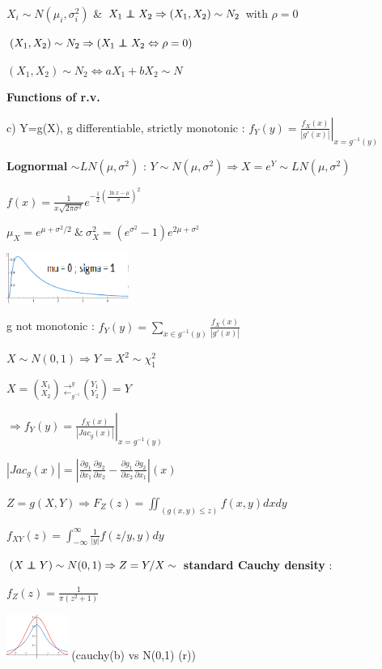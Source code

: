\documentclass[a4paper,10.5pt]{article}
\newcommand\independent{\protect\mathpalette{\protect\independenT}{\perp}}
\def\independenT#1#2{\mathrel{\rlap{$#1#2$}\mkern2mu{#1#2}}}
\begin{document}
\begin{multicols}{4}
		$X_i \sim N(\mu_i,\sigma_i^2)$ \& $X_1 \independent X_2 \Rightarrow (X_1,X_2) \sim N_2$ with $\rho=0$
		
		$(X_1,X_2)\sim N_2 \Rightarrow \left(X_1 \independent X_2 \Leftrightarrow \rho = 0\right)$
		
		$(X_1,X_2) \sim N_2 \Leftrightarrow aX_1+bX_2 \sim N$
		
		\textbf{Functions of r.v.}
		
		c) Y=g(X), g differentiable, strictly monotonic : $f_Y(y) = \left.\frac{f_X(x)}{|g'(x)|}\right|_{x=g^{-1}(y)}$
		
		\textbf{Lognormal} $\sim LN(\mu,\sigma^2)$ : $Y\sim N(\mu,\sigma^2) \Rightarrow X=e^Y \sim LN(\mu,\sigma^2)$ 
		
		$f(x) = \frac{1}{x\sqrt{2\pi\sigma^2}}e^{-\frac{1}{2}\left(\frac{\ln x - \mu}{\sigma}\right)^2}$
		
		$\mu_X = e^{\mu+\sigma^2/2}\ \&\ \sigma_X^2 = (e^{\sigma^2}-1)e^{2\mu+\sigma^2}$
		
		\includegraphics[width=4cm]{img/ln.png}
		
		g not monotonic : $f_Y(y) = \sum_{x\in g^{-1}(y)} \frac{f_X(x)}{|g'(x)|}$
		
		$X\sim N(0,1) \Rightarrow Y=X^2\sim \chi_1^2$
		
		$X = \left(^{X_1}_{X_2}\right)\  _{\leftarrow_{g^{-1}}}^{\to^g} \left(^{Y_1}_{Y_2}\right) = Y$
		
		$\Rightarrow f_Y(y) = \left.\frac{f_X(x)}{|Jac_g(x)|}\right|_{x=g^{-1}(y)}$
		
		$|Jac_g(x)| = \left|\frac{\partial g_1}{\partial x_1}\frac{\partial g_2}{\partial x_2}-\frac{\partial g_1}{\partial x_2}\frac{\partial g_2}{\partial x_1}\right|(x)$
		
		$Z=g(X,Y) \Rightarrow F_Z(z) = \iint_{(g(x,y) \leq z)}f(x,y)dxdy$
		
		$f_{XY}(z) = \int_{-\infty}^\infty \frac{1}{|y|}f(z/y,y)dy$
		
		$(X\independent Y) \sim N(0,1) \Rightarrow Z = Y/X \sim$ \textbf{standard Cauchy density} :
		
		$f_Z(z) = \frac{1}{\pi(z^2+1)}$
		
		\includegraphics[width=2cm]{img/Cauchy.PNG} (cauchy(b) vs N(0,1) (r))
		

\end{multicols}
\end{document}
